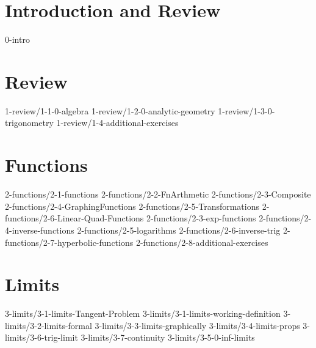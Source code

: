 \chapter*{Introduction and Review}
	{0-intro}

\chapter{Review}\label{chap:Review}
	{1-review/1-1-0-algebra}
	{1-review/1-2-0-analytic-geometry}
	{1-review/1-3-0-trigonometry}
	{1-review/1-4-additional-exercises}

\chapter{Functions}\label{chap:Functions}
	{2-functions/2-1-functions}
	{2-functions/2-2-FnArthmetic}
	{2-functions/2-3-Composite}
	{2-functions/2-4-GraphingFunctions}
	{2-functions/2-5-Transformations}
	{2-functions/2-6-Linear-Quad-Functions}
	{2-functions/2-3-exp-functions}
	{2-functions/2-4-inverse-functions}
	{2-functions/2-5-logarithms}
	{2-functions/2-6-inverse-trig}
	{2-functions/2-7-hyperbolic-functions}
	{2-functions/2-8-additional-exercises}

\chapter{Limits}\label{chap:Limits}
    {3-limits/3-1-limits-Tangent-Problem}
	{3-limits/3-1-limits-working-definition}
	{3-limits/3-2-limits-formal}
	{3-limits/3-3-limits-graphically}
	{3-limits/3-4-limits-props}
	{3-limits/3-6-trig-limit}
	{3-limits/3-7-continuity}
	{3-limits/3-5-0-inf-limits}


